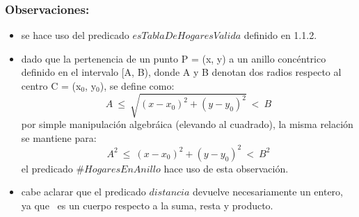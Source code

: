     \subsubsection{Observaciones:}
        \begin{itemize}
            \item se hace uso del predicado $esTablaDeHogaresValida$ definido en 1.1.2.
            \item dado que la pertenencia de un punto P = (x, y) a un anillo concéntrico definido en el intervalo 
            [A, B), donde A y B denotan dos radios respecto al centro C = (x$_{0}$, y$_{0}$), se define como: 
                \begin{equation}
                    A\ \leq\ \sqrt{(x - x_{0})^{2} + (y - y_{0})^{2}}\ <\ B
                \end{equation}
                por simple manipulación algebráica (elevando al cuadrado), la misma relación se mantiene para:
                \begin{equation}
                    A^{2}\ \leq\ (x - x_{0})^{2} + (y - y_{0})^{2}\ <\ B^{2}
                \end{equation}
                el predicado $\#HogaresEnAnillo$ hace uso de esta observaci\'on.
            \item cabe aclarar que el predicado $distancia$ devuelve necesariamente un entero, ya que \ent\ es un cuerpo respecto a
            la suma, resta y producto. 
        \end{itemize}